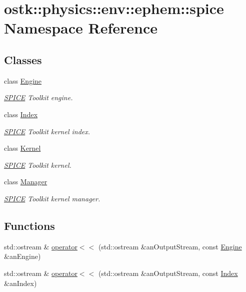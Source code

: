 \hypertarget{namespaceostk_1_1physics_1_1env_1_1ephem_1_1spice}{}\section{ostk\+:\+:physics\+:\+:env\+:\+:ephem\+:\+:spice Namespace Reference}
\label{namespaceostk_1_1physics_1_1env_1_1ephem_1_1spice}
\subsection*{Classes}
\begin{DoxyCompactItemize}
\item 
class \hyperlink{classostk_1_1physics_1_1env_1_1ephem_1_1spice_1_1_engine}{Engine}
\begin{DoxyCompactList}\small\item\em \hyperlink{classostk_1_1physics_1_1env_1_1ephem_1_1_s_p_i_c_e}{S\+P\+I\+CE} Toolkit engine. \end{DoxyCompactList}\item 
class \hyperlink{classostk_1_1physics_1_1env_1_1ephem_1_1spice_1_1_index}{Index}
\begin{DoxyCompactList}\small\item\em \hyperlink{classostk_1_1physics_1_1env_1_1ephem_1_1_s_p_i_c_e}{S\+P\+I\+CE} Toolkit kernel index. \end{DoxyCompactList}\item 
class \hyperlink{classostk_1_1physics_1_1env_1_1ephem_1_1spice_1_1_kernel}{Kernel}
\begin{DoxyCompactList}\small\item\em \hyperlink{classostk_1_1physics_1_1env_1_1ephem_1_1_s_p_i_c_e}{S\+P\+I\+CE} Toolkit kernel. \end{DoxyCompactList}\item 
class \hyperlink{classostk_1_1physics_1_1env_1_1ephem_1_1spice_1_1_manager}{Manager}
\begin{DoxyCompactList}\small\item\em \hyperlink{classostk_1_1physics_1_1env_1_1ephem_1_1_s_p_i_c_e}{S\+P\+I\+CE} Toolkit kernel manager. \end{DoxyCompactList}\end{DoxyCompactItemize}
\subsection*{Functions}
\begin{DoxyCompactItemize}
\item 
std\+::ostream \& \hyperlink{namespaceostk_1_1physics_1_1env_1_1ephem_1_1spice_a02f507597637eec49f735447ee961dcf}{operator$<$$<$} (std\+::ostream \&an\+Output\+Stream, const \hyperlink{classostk_1_1physics_1_1env_1_1ephem_1_1spice_1_1_engine}{Engine} \&an\+Engine)
\item 
std\+::ostream \& \hyperlink{namespaceostk_1_1physics_1_1env_1_1ephem_1_1spice_a4e4a1cb140a04b637f793e1bfb03eb02}{operator$<$$<$} (std\+::ostream \&an\+Output\+Stream, const \hyperlink{classostk_1_1physics_1_1env_1_1ephem_1_1spice_1_1_index}{Index} \&an\+Index)
\end{DoxyCompactItemize}

